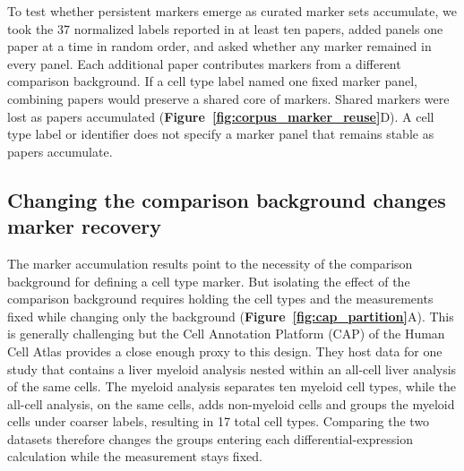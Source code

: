\documentclass[10pt,twocolumn]{article}
\theoremstyle{plain}
\theoremstyle{definition}
\theoremstyle{remark}
\begin{document}
To test whether persistent markers emerge as curated marker sets accumulate, we took the 37 normalized labels reported in at least ten papers, added panels one paper at a time in random order, and asked whether any marker remained in every panel. Each additional paper contributes markers from a different comparison background. If a cell type label named one fixed marker panel, combining papers would preserve a shared core of markers. Shared markers were lost as papers accumulated (\textbf{Figure~\ref{fig:corpus_marker_reuse}}D).  A cell type label or identifier does not specify a marker panel that remains stable as papers accumulate.






\subsection*{Changing the comparison background changes marker recovery}

The marker accumulation results point to the necessity of the comparison background for defining a cell type marker. But isolating the effect of the comparison background requires holding the cell types and the measurements fixed while changing only the background (\textbf{Figure~\ref{fig:cap_partition}}A). This is generally challenging but the Cell Annotation Platform (CAP) of the Human Cell Atlas provides a close enough proxy to this design. They host data for one study that contains a liver myeloid analysis nested within an all-cell liver analysis of the same cells. The myeloid analysis separates ten myeloid cell types, while the all-cell analysis, on the same cells, adds non-myeloid cells and groups the myeloid cells under coarser labels, resulting in 17 total cell types. Comparing the two datasets therefore changes the groups entering each differential-expression calculation while the measurement stays fixed.
\end{document}
